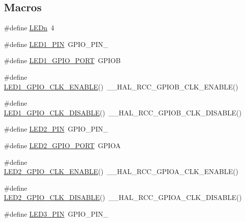 \subsection*{Macros}
\begin{DoxyCompactItemize}
\item 
\#define \hyperlink{group__B-L072Z-LRWAN1__LOW__LEVEL__LED_gab4be2480bf7d44d52aab1190a65a733c}{L\+E\+Dn}~4
\item 
\#define \hyperlink{group__B-L072Z-LRWAN1__LOW__LEVEL__LED_ga318aa17e5d40e2132d2c7f6269ce7f51}{L\+E\+D1\+\_\+\+P\+IN}~G\+P\+I\+O\+\_\+\+P\+I\+N\+\_
\item 
\#define \hyperlink{group__B-L072Z-LRWAN1__LOW__LEVEL__LED_ga5d97443b4011e40e47164445dc1adde0}{L\+E\+D1\+\_\+\+G\+P\+I\+O\+\_\+\+P\+O\+RT}~G\+P\+I\+OB
\item 
\#define \hyperlink{group__B-L072Z-LRWAN1__LOW__LEVEL__LED_gae90d969ab305110513ff3c2c0874f2e7}{L\+E\+D1\+\_\+\+G\+P\+I\+O\+\_\+\+C\+L\+K\+\_\+\+E\+N\+A\+B\+LE}()~\+\_\+\+\_\+\+H\+A\+L\+\_\+\+R\+C\+C\+\_\+\+G\+P\+I\+O\+B\+\_\+\+C\+L\+K\+\_\+\+E\+N\+A\+B\+LE()
\item 
\#define \hyperlink{group__B-L072Z-LRWAN1__LOW__LEVEL__LED_ga62e716eb8db20c4eccd17c29968d67c4}{L\+E\+D1\+\_\+\+G\+P\+I\+O\+\_\+\+C\+L\+K\+\_\+\+D\+I\+S\+A\+B\+LE}()~\+\_\+\+\_\+\+H\+A\+L\+\_\+\+R\+C\+C\+\_\+\+G\+P\+I\+O\+B\+\_\+\+C\+L\+K\+\_\+\+D\+I\+S\+A\+B\+LE()
\item 
\#define \hyperlink{group__B-L072Z-LRWAN1__LOW__LEVEL__LED_gaf6f84078113b55354d20585131b386f7}{L\+E\+D2\+\_\+\+P\+IN}~G\+P\+I\+O\+\_\+\+P\+I\+N\+\_
\item 
\#define \hyperlink{group__B-L072Z-LRWAN1__LOW__LEVEL__LED_gaf88822ae4b79d37c7735ce1160b59f68}{L\+E\+D2\+\_\+\+G\+P\+I\+O\+\_\+\+P\+O\+RT}~G\+P\+I\+OA
\item 
\#define \hyperlink{group__B-L072Z-LRWAN1__LOW__LEVEL__LED_ga810e6c23b9a3e66da601b0058ec7a245}{L\+E\+D2\+\_\+\+G\+P\+I\+O\+\_\+\+C\+L\+K\+\_\+\+E\+N\+A\+B\+LE}()~\+\_\+\+\_\+\+H\+A\+L\+\_\+\+R\+C\+C\+\_\+\+G\+P\+I\+O\+A\+\_\+\+C\+L\+K\+\_\+\+E\+N\+A\+B\+LE()
\item 
\#define \hyperlink{group__B-L072Z-LRWAN1__LOW__LEVEL__LED_ga57f4d9343f3fe6d94d83ab2cb45c7d75}{L\+E\+D2\+\_\+\+G\+P\+I\+O\+\_\+\+C\+L\+K\+\_\+\+D\+I\+S\+A\+B\+LE}()~\+\_\+\+\_\+\+H\+A\+L\+\_\+\+R\+C\+C\+\_\+\+G\+P\+I\+O\+A\+\_\+\+C\+L\+K\+\_\+\+D\+I\+S\+A\+B\+LE()
\item 
\#define \hyperlink{group__B-L072Z-LRWAN1__LOW__LEVEL__LED_ga4cb3ff938bcabb01494ce529ae55a542}{L\+E\+D3\+\_\+\+P\+IN}~G\+P\+I\+O\+\_\+\+P\+I\+N\+\_

\end{DoxyCompactItemize}
